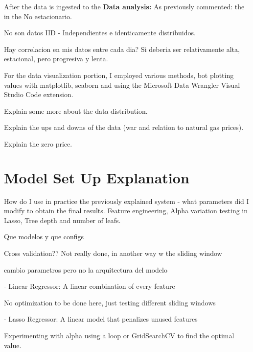 \documentclass[12pt]{report} %
\begin{document}
After the data is ingested to the 
\noindent \textbf{Data analysis:}
As previously commented: the in the
No estacionario.

No son datos IID - Independientes e identicamente distribuidos.

Hay correlacion en mis datos entre cada dia? Si deberia ser relativamente alta, estacional, pero progresiva y lenta.

For the data visualization portion, I employed various methods, bot plotting values with matplotlib, seaborn and using the Microsoft Data Wrangler Visual Studio Code extension.

Explain some more about the data distribution.

Explain the ups and downs of the data (war and relation to natural gas prices).

Explain the zero price.


\section{Model Set Up Explanation}
How do I use in practice the previously explained system - what parameters did I modify to obtain the final results. Feature engineering, Alpha variation testing in Lasso, Tree depth and number of leafs.

Que modelos y que configs

Cross validation?? Not really done, in another way w the sliding window

cambio parametros pero no la arquitectura del modelo



- Linear Regressor: A linear combination of every feature

No optimization to be done here, just testing different sliding windows

- Lasso Regressor: A linear model that penalizes unused features

Experimenting with alpha using a loop or GridSearchCV to find the optimal value.

\end{document}

